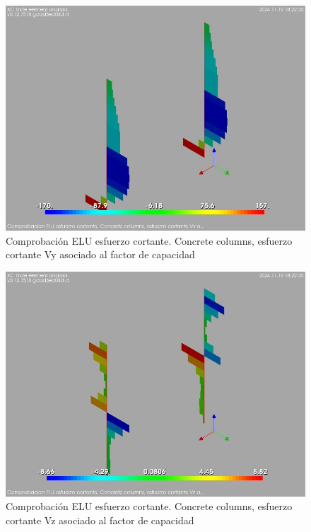 \begin{figure}[ht]
\begin{center}
\includegraphics[width=\linewidth]{results/graphics/shearULS/columnZconcrVy}
\caption{Comprobación ELU esfuerzo cortante. Concrete columns, esfuerzo cortante Vy asociado al factor de capacidad}
\label{ULS_shearResistancecolumnZconcrVy}
\end{center}
\end{figure}
\begin{figure}[ht]
\begin{center}
\includegraphics[width=\linewidth]{results/graphics/shearULS/columnZconcrVz}
\caption{Comprobación ELU esfuerzo cortante. Concrete columns, esfuerzo cortante Vz asociado al factor de capacidad}
\label{ULS_shearResistancecolumnZconcrVz}
\end{center}
\end{figure}
